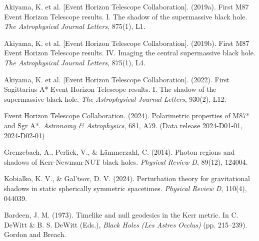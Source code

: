 \documentclass[12pt,a4paper]{article}
\begin{document}


\newpage

\begin{thebibliography}{}

Akiyama, K. et al. [Event Horizon Telescope Collaboration]. (2019a).
First M87 Event Horizon Telescope results. I. The shadow of the supermassive black hole.
\textit{The Astrophysical Journal Letters}, 875(1), L1.

Akiyama, K. et al. [Event Horizon Telescope Collaboration]. (2019b).
First M87 Event Horizon Telescope results. IV. Imaging the central supermassive black hole.
\textit{The Astrophysical Journal Letters}, 875(1), L4.

Akiyama, K. et al. [Event Horizon Telescope Collaboration]. (2022).
First Sagittarius A* Event Horizon Telescope results. I. The shadow of the supermassive black hole.
\textit{The Astrophysical Journal Letters}, 930(2), L12.

Event Horizon Telescope Collaboration. (2024).
Polarimetric properties of M87* and Sgr A*.
\textit{Astronomy \& Astrophysics}, 681, A79. (Data release 2024-D01-01, 2024-D02-01)

Grenzebach, A., Perlick, V., \& L{\"a}mmerzahl, C. (2014).
Photon regions and shadows of Kerr-Newman-NUT black holes.
\textit{Physical Review D}, 89(12), 124004.

Kobialko, K. V., \& Gal'tsov, D. V. (2024).
Perturbation theory for gravitational shadows in static spherically symmetric spacetimes.
\textit{Physical Review D}, 110(4), 044039.

Bardeen, J. M. (1973). Timelike and null geodesics in the Kerr metric.
In C. DeWitt \& B. S. DeWitt (Eds.), \textit{Black Holes (Les Astres Occlus)} (pp. 215--239).
Gordon and Breach.

\end{thebibliography}
\end{document}
